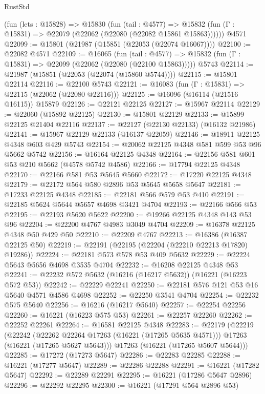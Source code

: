\begin{lexlean}{RustStd}
\begin{coremodule}
    (fun (lets : @15828) =>
    @15830
      (fun (tail : @4577) =>
      @15832 (fun (Γ : @15831) => @22079 (@22062 (@22080 (@22082 @15861 @15863))))))
    @4571
@22099 := @15801 (@21987 (@15851 (@22053 (@22074 @16067))))
@22100 := @22082 @4571
@22109 := @16065
    (fun (tail : @4577) => @15832 (fun (Γ : @15831) => @22099 (@22062 (@22080 (@22100 @15863)))))
    @5743
@22114 := @21987 (@15851 (@22053 (@22074 (@15860 @5744))))
@22115 := @15801 @22114
@22116 := @22100 @5743
@22121 := @16083 (fun (Γ : @15831) => @22115 (@22062 (@22080 @22116)))
@22125 := @16096 (@16114 (@21516 @16115)) @15879
@22126 := @22121 @22125
@22127 := @15967 @22114
@22129 := @22060 (@15892 @22125)
@22130 := @15801 @22129
@22133 := @15899 @22125 @21404 @22116
@22137 := @22127 (@22130 @22133) (@16132 @21986)
@22141 := @15967 @22129 @22133 (@16137 @22059)
@22146 := @18911 @22125 @4348 @603 @429 @5743
@22154 := @20062 @22125 @4348 @581 @599 @53 @96 @5662 @5742
@22156 := @16164 @22125 @4348
@22164 := @22156 @581 @601 @53 @210 @5662 (@4578 @5742 @4586)
@22166 := @17794 @22125 @4348
@22170 := @22166 @581 @53 @5645 @5660
@22172 := @17220 @22125 @4348
@22179 := @22172 @564 @580 @2896 @53 @5645 @5658 @5647
@22181 := @17233 @22125 @4348
@22185 := @22181 @566 @579 @53 @410
@22191 := @22185 @5624 @5644 @5657 @4698 @3421 @4704
@22193 := @22166 @566 @53
@22195 := @22193 @5620 @5622
@22200 := @19266 @22125 @4348 @143 @53 @96
@22204 := @22200 @4767 @4983 @3049 @4704
@22209 := @16378 @22125 @4348 @50 @429 @50
@22210 := @22209 @4767
@22213 := @16386 (@16387 @22125 @50)
@22219 := @22191 (@22195 (@22204 (@22210 @22213 @17820) @19286))
@22224 := @22181 @573 @578 @53 @409 @5632
@22229 := @22224 @5643 @5656 @4698 @3535 @4704
@22232 := @16208 @22125 @4348 @53
@22241 := @22232 @572 @5632 (@16216 (@16217 @5632)) (@16221 (@16223 @572 @53))
@22242 := @22229 @22241
@22250 := @22181 @576 @121 @53 @16 @5640 @4571 @4586 @4698
@22252 := @22250 @3541 @4704
@22254 := @22232 @575 @5640
@22256 := @16216 (@16217 @5640)
@22257 := @22254 @22256
@22260 := @16221 (@16223 @575 @53)
@22261 := @22257 @22260
@22262 := @22252 @22261
@22264 := @16581 @22125 @4348
@22283 := @22179
    (@22219
      (@22242
        (@22262 @22264 @17263 (@16221 (@17265 @5635 @4571)))
        @17263
        (@16221 (@17265 @5627 @5643)))
      @17263
      (@16221 (@17265 @5607 @5644)))
@22285 := @17272 (@17273 @5647)
@22286 := @22283 @22285
@22288 := @16221 (@17277 @5647)
@22289 := @22286 @22288
@22291 := @16221 (@17282 @5647)
@22292 := @22289 @22291
@22295 := @16221 (@17286 @5647 @2896)
@22296 := @22292 @22295
@22300 := @16221 (@17291 @564 @2896 @53)

\end{coremodule}
\end{lexlean}
